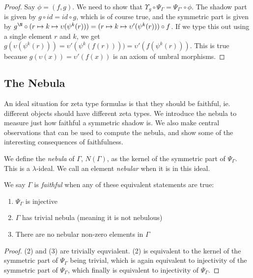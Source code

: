 \begin{proof}
  Say $\phi = (f, g)$. We need to show that $\Upsilon_{g} \circ \Psi_\Gamma = \Psi_{\Gamma'} \circ \phi$. The shadow part is given by $g \circ id = id \circ g$, which is of course true, and the symmetric part is given by $g^{\N} \circ (r \mapsto k \mapsto \upsilon(\psi^k(r))) = (r \mapsto k \mapsto \upsilon'(\psi^k(r))) \circ f$. If we type this out using a single element $r$ and $k$, we get $g(\upsilon(\psi^k(r))) = \upsilon'(\psi^k(f(r)))) = \upsilon'(f(\psi^k(r)))$. This is true because $g(\upsilon(x)) = \upsilon'(f(x))$ is an axiom of umbral morphisms. \qedhere
\end{proof}

\subsection{The Nebula}
An ideal situation for zeta type formulas is that they should be faithful, ie. different objects should have different zeta types. We introduce the nebula to measure just how faithful a symmetric shadow is. We also make central observations that can be used to compute the nebula, and show some of the interesting consequences of faithfulness. 


\begin{definition}
  We define the \emph{nebula} of $\Gamma$, $N(\Gamma)$, as the kernel of the symmetric part of $\Psi_\Gamma$. This is a $\lambda$-ideal. We call an element \emph{nebular} when it is in this ideal.
\end{definition}

\begin{propdef}
  We say $\Gamma$ is \emph{faithful} when any of these equivalent statements are true:
  \begin{enumerate}
    \item $\Psi_\Gamma$ is injective
    \item $\Gamma$ has trivial nebula (meaning it is not nebulous)
    \item There are no nebular non-zero elements in $\Gamma$
  \end{enumerate}
\end{propdef}

\begin{proof}
  (2) and (3) are trivially equvialent. (2) is equivalent to the kernel of the symmetric part of $\Psi_\Gamma$ being trivial, which is again equivalent to injectivity of the symmetric part of $\Psi_\Gamma$, which finally is equivalent to injectivity of $\Psi_\Gamma$. 
\end{proof}

